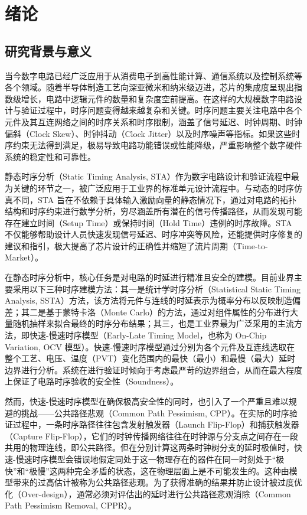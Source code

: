 \chapter{绪论}

\section{研究背景与意义}

当今数字电路已经广泛应用于从消费电子到高性能计算、通信系统以及控制系统等各个领域。随着半导体制造工艺向深亚微米和纳米级迈进，芯片的集成度呈现出指数级增长，电路中逻辑元件的数量和复杂度空前提高。在这样的大规模数字电路设计与验证过程中，时序问题变得越来越复杂和关键。时序问题主要关注电路中各个元件及其互连网络之间的时序关系和时序限制，涵盖了信号延迟、时钟周期、时钟偏斜（Clock Skew）、时钟抖动（Clock Jitter）以及时序噪声等指标。如果这些时序约束无法得到满足，极易导致电路功能错误或性能降级，严重影响整个数字硬件系统的稳定性和可靠性。

静态时序分析（Static Timing Analysis, STA）作为数字电路设计和验证流程中最为关键的环节之一，被广泛应用于工业界的标准单元设计流程中。与动态的时序仿真不同，STA 旨在不依赖于具体输入激励向量的静态情况下，通过对电路的拓扑结构和时序约束进行数学分析，穷尽涵盖所有潜在的信号传播路径，从而发现可能存在建立时间（Setup Time）或保持时间（Hold Time）违例的时序故障。STA 不仅能够帮助设计人员快速发现信号延迟、时序冲突等风险，还能提供时序修复的建议和指引，极大提高了芯片设计的正确性并缩短了流片周期（Time-to-Market）。

在静态时序分析中，核心任务是对电路的时延进行精准且安全的建模。目前业界主要采用以下三种时序建模方法：其一是统计学时序分析（Statistical Static Timing Analysis, SSTA）方法，该方法将元件与连线的时延表示为概率分布以反映制造偏差；其二是基于蒙特卡洛（Monte Carlo）的方法，通过对组件属性的分布进行大量随机抽样来拟合最终的时序分布结果；其三，也是工业界最为广泛采用的主流方法，即快速-慢速时序模型（Early-Late Timing Model，也称为 On-Chip Variation, OCV 模型）\cite{TODO_ocv_model}。快速-慢速时序模型通过分别为各个元件及互连线选取在整个工艺、电压、温度（PVT）变化范围内的最快（最小）和最慢（最大）延时边界进行分析。系统在进行验证时倾向于考虑最严苛的边界组合，从而在最大程度上保证了电路时序验收的安全性（Soundness）。

然而，快速-慢速时序模型在确保极高安全性的同时，也引入了一个严重且难以规避的挑战——公共路径悲观（Common Path Pessimism, CPP）。在实际的时序验证过程中，一条时序路径往往包含发射触发器（Launch Flip-Flop）和捕获触发器（Capture Flip-Flop），它们的时钟传播网络往往在时钟源与分支点之间存在一段共用的物理连线，即公共路径。但在分别计算这两条时钟树分支的延时极值时，快速-慢速时序模型会错误地假定同处于这一物理存在的器件在同一时刻处于“极快”和“极慢”这两种完全矛盾的状态，这在物理层面上是不可能发生的。这种由模型带来的过高估计被称为公共路径悲观。为了获得准确的结果并防止设计被过度优化（Over-design），通常必须对评估出的延时进行公共路径悲观消除（Common Path Pessimism Removal, CPPR）\cite{TODO_cppr_survey}。

